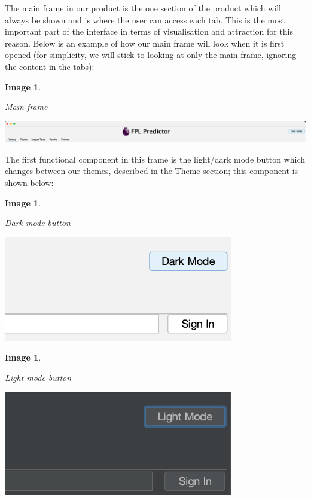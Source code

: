 \documentclass[12pt, a4paper, oneside]{book}
\newtheorem{image}[theorem]{Image}
\numberwithin{equation}{section}
\begin{document}
The main frame in our product is the one section of the product which will always be shown and is where the user can access each tab. This is the most important part of the interface in terms of visualisation and attraction for this reason. Below is an example of how our main frame will look when it is first opened (for simplicity, we will stick to looking at only the main frame, ignoring the content in the tabs):

\begin{image} \label{Main frame}

  Main frame

  \vspace{0.5cm}

  \centerline{\includegraphics[width=1\textwidth]{images/gui/main/main-frame.png}}

\end{image}

The first functional component in this frame is the light/dark mode button which changes between our themes, described in the \hyperref[sec:6.3]{Theme section}; this component is shown below:

\begin{image} \label{Dark mode button}

  Dark mode button

  \vspace{0.5cm}

  \centerline{\includegraphics[width=0.75\textwidth]{images/gui/theme/dark-mode-button}}

\end{image}

\begin{image} \label{Light mode button}

  Light mode button

  \vspace{0.5cm}

  \centerline{\includegraphics[width=0.75\textwidth]{images/gui/theme/light-mode-button}}

\end{image}
\end{document}
